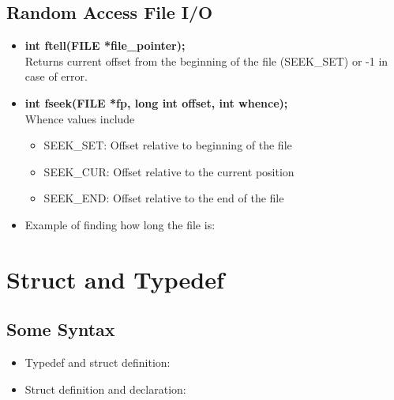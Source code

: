 \documentclass{article}
\begin{document}
\subsection{Random Access File I/O}
\begin{itemize}
    \item \textbf{int ftell(FILE *file\_pointer);}\\
    Returns current offset from the beginning of the file (SEEK\_SET) or -1 in case of error.
    \item \textbf{int fseek(FILE *fp, long int offset, int whence);}\\
    Whence values include
    \begin{itemize}
        \item SEEK\_SET: Offset relative to beginning of the file 
        \item SEEK\_CUR: Offset relative to the current position
        \item SEEK\_END: Offset relative to the end of the file
    \end{itemize}
    \item Example of finding how long the file is:
\end{itemize}

\section{Struct and Typedef}

\subsection{Some Syntax}
\begin{itemize}
    \item Typedef and struct definition:
    \item Struct definition and declaration:
\end{itemize}
\end{document}
